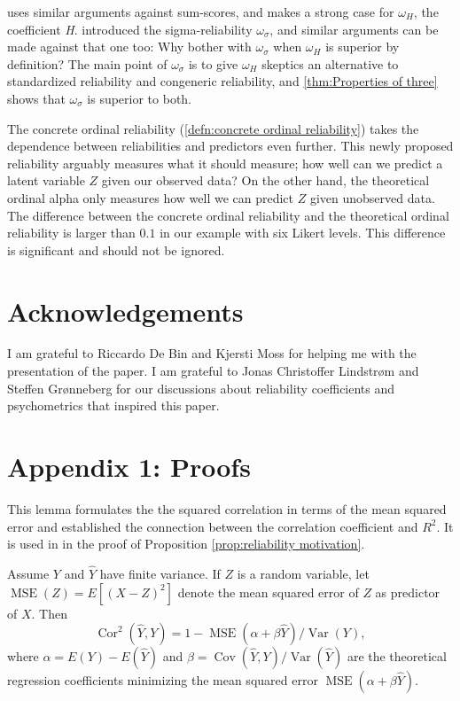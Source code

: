 \documentclass[twoside]{article}
\DeclareMathOperator{\Var}{Var}
\DeclareMathOperator{\Cor}{Cor}
\DeclareMathOperator{\Cov}{Cov}
\DeclareMathOperator{\MSE}{MSE}
\begin{document}
\citet{McNeish2019-ea} uses similar arguments against sum-scores, and makes a strong case for $\omega_H$, the coefficient \textit{H}.  introduced the sigma-reliability $\omega_\sigma$, and similar arguments can be made against that one too: Why bother with $\omega_\sigma$ when $\omega_H$ is superior by definition? The main point of $\omega_\sigma$ is to give $\omega_H$ skeptics an alternative to standardized reliability and congeneric reliability, and \cref{thm:Properties of three} shows that $\omega_\sigma$ is superior to both. 

The concrete ordinal reliability (\cref{defn:concrete ordinal reliability}) takes the dependence between reliabilities and predictors even further. This newly proposed reliability arguably measures what it should measure; how well can we predict a latent variable $Z$ given our observed data? On the other hand, the theoretical ordinal alpha only measures how well we can predict $Z$ given unobserved data. The difference between the concrete ordinal reliability and the theoretical ordinal reliability is larger than $0.1$ in our example with six Likert levels. This difference is significant and should not be ignored.

\section{Acknowledgements}
I am grateful to Riccardo De Bin and Kjersti Moss for helping me with the presentation of the paper. I am grateful to Jonas Christoffer Lindstrøm and Steffen Grønneberg for our discussions about reliability coefficients and psychometrics that inspired this paper.

\clearpage
\section*{Appendix 1: Proofs}
\label{appendix 1}

This lemma formulates the the squared correlation in terms of the mean squared error and established the connection between the correlation coefficient and $R^2$. It is used in in the proof of Proposition \ref{prop:reliability motivation}. 
\begin{lem}
\label{lem:r^2 and correlation}Assume $Y$ and $\hat{Y}$ have finite
variance. If $Z$ is a random variable, let $\MSE(Z) = E[(X-Z)^2]$ denote the mean squared error of $Z$ as predictor of $X$. Then 
\begin{equation}
\Cor^{2}(\hat{Y},Y)=1-\MSE(\alpha+\beta\hat{Y})/\Var(Y),\label{eq:rsq and correlation}
\end{equation}
where $\alpha=E(Y)-E(\hat{Y})$ and $\beta=\Cov(\hat{Y},Y)/\Var(\hat{Y})$ are the theoretical regression coefficients minimizing the mean squared error $\MSE(\alpha+\beta\hat{Y})$. 
\end{lem}
\end{document}
